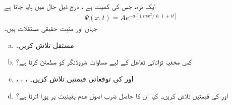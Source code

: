 ایک ذرہ،  جس کی کمیت  ہے ، درج ذیل حال میں پایا جاتا ہے 
\begin{align*}
\Psi (x,t)=Ae^{-a[(mx^{2}/\hslash)+it]}
\end{align*}
جہاں  اور   مثبت حقیقی مستقلات  ہیں۔
\begin{enumerate}[a.]
\item
مستقل  تلاش کریں۔
\item
کس مخفیہ توانائی تفاعل  کے لیے  مساوات شروڈنگر کو مطمئن کرتا ہے؟
\item
{}، ، ،  اور  کی توقعاتی قیمتیں تلاش کریں۔
\item
{} اور  کی قیمتیں تلاش کریں۔ کیا ان کا حاصل ضرب اصول عدم یقینیت پر پورا اترتا ہے؟
\end{enumerate}

